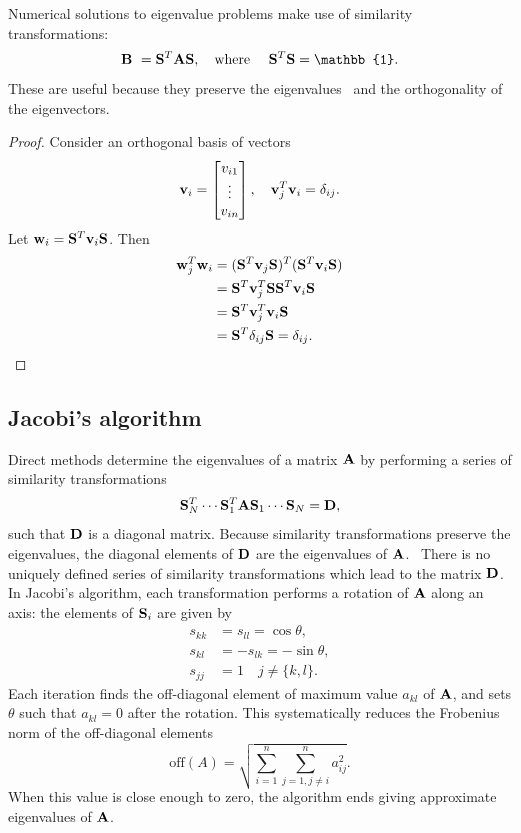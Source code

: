 \documentclass[a4paper,10pt,twocolumn]{article}
\begin{document}
Numerical solutions to eigenvalue problems make use of similarity transformations:
\[
\vb{B} = \vb{S}^T\vb{A}\vb{S}, \qq{where} \vb{S}^T\vb{S} = \mathbb{1}.
\]
These are useful because they preserve the eigenvalues \cite{lecture} and the orthogonality of the eigenvectors.
 \begin{proof}
Consider an orthogonal basis of vectors 
\[
\vb{v}_i = \bmqty{v_{i1}\\\vdots\\v_{in}}\qcomma \vb{v}_j^T\vb{v}_i = \delta_{ij}.
\]
Let \(\vb{w}_i = \vb{S}^T\vb{v}_i\vb{S}\). Then
\begin{align*}
\vb{w}_j^T\vb{w}_i &= (\vb{S}^T\vb{v}_j\vb{S})^T(\vb{S}^T\vb{v}_i\vb{S}) 
\\& = \vb{S}^T\vb{v}_j^T\vb{S}\vb{S}^T\vb{v}_i\vb{S}
\\& = \vb{S}^T\vb{v}_j^T\vb{v}_i\vb{S}
\\& = \vb{S}^T\delta_{ij}\vb{S} = \delta_{ij}.
\end{align*}

\end{proof}

\subsection*{Jacobi's algorithm}
Direct methods determine the eigenvalues of a matrix $\vb{A}$ by performing a series of similarity transformations 
\[
\vb{S}_N^T \cdots \vb{S}_1^T \vb{A} \vb{S}_1\cdots \vb{S}_N = \vb{D}, 
\]
such that $\vb{D}$ is a diagonal matrix. Because similarity transformations preserve the eigenvalues, the diagonal elements of $\vb{D}$ are the eigenvalues of $\vb{A}$. 
There is no uniquely defined series of similarity transformations which lead to the matrix $\vb{D}$. 
In Jacobi's algorithm, each transformation performs a rotation of $\vb{A}$ along an axis: the elements of $\vb{S}_i$ are given by 
\begin{align*}
s_{kk} &= s_{ll} = \cos\theta,
\\s_{kl} &= -s_{lk} = -\sin\theta,
\\ s_{jj} &= 1\quad j\neq\{k,l\}.
\end{align*}
Each iteration finds the off-diagonal element of maximum value $a_{kl}$ of $\vb{A}$, and sets $\theta$ such that $a_{kl}=0$ after the rotation. 
This systematically reduces the Frobenius norm of the off-diagonal elements
\[
\mathrm{off}(A) = \sqrt{\sum_{i=1}^n\sum_{j=1,j\neq i}^n a_{ij}^2}.
\]
When this value is close enough to zero, the algorithm ends giving approximate eigenvalues of $\vb{A}$.
\end{document}

